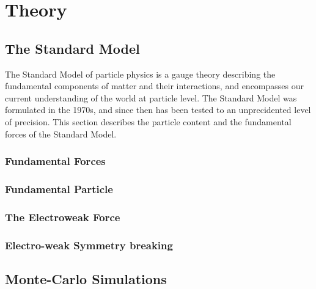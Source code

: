 \graphicspath{{Chapters/Theory/Figures/}}
\chapter{Theory}
\label{chap:Theory}

\section{The Standard Model}

The Standard Model of particle physics is a gauge theory describing the
fundamental components of matter and their interactions, and encompasses our
current understanding of the world at particle level. The Standard Model was
formulated in the 1970s, and since then has been tested to an unprecidented
level of precision. %
This section describes the particle content and the fundamental forces of the Standard Model.

\subsection{Fundamental Forces}

\subsection{Fundamental Particle}

\subsection{The Electroweak Force}

\subsection{Electro-weak Symmetry breaking}

\section{Monte-Carlo Simulations}
